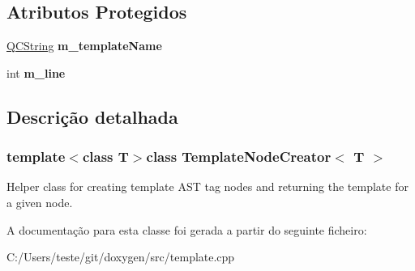 \subsection*{Atributos Protegidos}
\begin{DoxyCompactItemize}
\item 
\hypertarget{class_template_node_creator_a5ac900d00b9e864db9e0720fc7ab0288}{\hyperlink{class_q_c_string}{Q\-C\-String} {\bfseries m\-\_\-template\-Name}}\label{class_template_node_creator_a5ac900d00b9e864db9e0720fc7ab0288}

\item 
\hypertarget{class_template_node_creator_a434474dfe11c603cd3512231cdaa8baa}{int {\bfseries m\-\_\-line}}\label{class_template_node_creator_a434474dfe11c603cd3512231cdaa8baa}

\end{DoxyCompactItemize}


\subsection{Descrição detalhada}
\subsubsection*{template$<$class T$>$class Template\-Node\-Creator$<$ T $>$}

Helper class for creating template A\-S\-T tag nodes and returning the template for a given node. 

A documentação para esta classe foi gerada a partir do seguinte ficheiro\-:\begin{DoxyCompactItemize}
\item 
C\-:/\-Users/teste/git/doxygen/src/template.\-cpp\end{DoxyCompactItemize}
